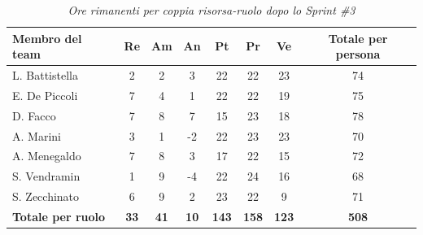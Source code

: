 \documentclass[a4paper, 10pt, colorlinks=true, linkcolor=black, urlcolor=blue, citecolor=blue, hidelinks]{article}
\renewcommand{\arraystretch}{1.2}
\begin{document}
\begin{table}[H]
    \centering
    \renewcommand{\arraystretch}{1.4}
    \begin{tabular}{|l|c|c|c|c|c|c|c|}
        \hline
        \rowcolor{bluBitless!15}
        \textbf{Membro del team} & \textbf{Re} & \textbf{Am} & \textbf{An} & \textbf{Pt} & \textbf{Pr} & \textbf{Ve} & \textbf{Totale per persona} \\
        \hline
        L. Battistella & 2 & 2 & 3 & 22 & 22 & 23 & 74 \\ \hline
        E. De Piccoli & 7 & 4 & 1 & 22 & 22 & 19 & 75 \\ \hline
        D. Facco & 7 & 8 & 7 & 15 & 23 & 18 & 78 \\ \hline
        A. Marini & 3 & 1 & -2 & 22 & 23 & 23 & 70 \\ \hline
        A. Menegaldo & 7 & 8 & 3 & 17 & 22 & 15 & 72 \\ \hline
        S. Vendramin & 1 & 9 & -4 & 22 & 24 & 16 & 68 \\ \hline
        S. Zecchinato & 6 & 9 & 2 & 23 & 22 & 9 & 71 \\ \hline
        \rowcolor{bluBitless!8}
        \textbf{Totale per ruolo} & \textbf{33} & \textbf{41} & \textbf{10} & \textbf{143} & \textbf{158} & \textbf{123} & \textbf{508} \\
        \hline
    \end{tabular}
    \caption{\textit{Ore rimanenti per coppia risorsa-ruolo dopo lo Sprint \#3}}
\end{table}
\end{document}
